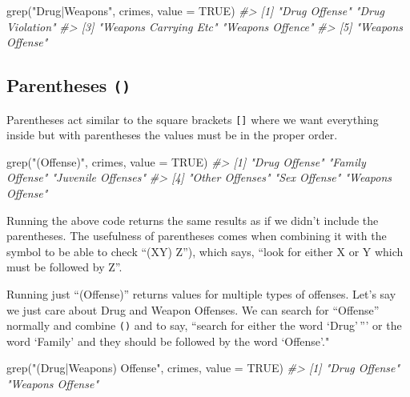 \documentclass[
]{krantz}
\makeatletter
\newenvironment{Shaded}{\begin{snugshade}}{\end{snugshade}}
\newcommand{\AttributeTok}[1]{\textcolor[rgb]{0.61,0.61,0.61}{#1}}
\newcommand{\CommentTok}[1]{\textcolor[rgb]{0.37,0.37,0.37}{\textit{#1}}}
\newcommand{\ConstantTok}[1]{\textcolor[rgb]{0,0,0}{#1}}
\newcommand{\FunctionTok}[1]{\textcolor[rgb]{0,0,0}{#1}}
\newcommand{\NormalTok}[1]{#1}
\newcommand{\StringTok}[1]{\textcolor[rgb]{0.5,0.5,0.5}{#1}}
\newenvironment{kframe}{%
\medskip{}
\setlength{\fboxsep}{.8em}
 \def\at@end@of@kframe{}%
 \ifinner\ifhmode%
  \def\at@end@of@kframe{\end{minipage}}%
  \begin{minipage}{\columnwidth}%
 \fi\fi%
 \def\FrameCommand##1{\hskip\@totalleftmargin \hskip-\fboxsep
 \colorbox{shadecolor}{##1}\hskip-\fboxsep
     \hskip-\linewidth \hskip-\@totalleftmargin \hskip\columnwidth}%
 \MakeFramed {\advance\hsize-\width
   \@totalleftmargin\z@ \linewidth\hsize
   \@setminipage}}%
 {\par\unskip\endMakeFramed%
 \at@end@of@kframe}
\renewenvironment{Shaded}{\begin{kframe}}{\end{kframe}}
\makeatother
\begin{document}
\begin{Shaded}
\begin{Highlighting}[]
\FunctionTok{grep}\NormalTok{(}\StringTok{"Drug|Weapons"}\NormalTok{, crimes, }\AttributeTok{value =} \ConstantTok{TRUE}\NormalTok{)}
\CommentTok{\#\textgreater{} [1] "Drug Offense"         "Drug Violation"      }
\CommentTok{\#\textgreater{} [3] "Weapons Carrying Etc" "Weapons Offence"     }
\CommentTok{\#\textgreater{} [5] "Weapons Offense"}
\end{Highlighting}
\end{Shaded}

\hypertarget{parentheses}{%
\subsection{\texorpdfstring{Parentheses \texttt{()}}{Parentheses ()}}\label{parentheses}}

Parentheses act similar to the square brackets \texttt{{[}{]}} where we want everything inside but with parentheses the values must be in the proper order.

\begin{Shaded}
\begin{Highlighting}[]
\FunctionTok{grep}\NormalTok{(}\StringTok{"(Offense)"}\NormalTok{, crimes, }\AttributeTok{value =} \ConstantTok{TRUE}\NormalTok{)}
\CommentTok{\#\textgreater{} [1] "Drug Offense"      "Family Offense"    "Juvenile Offenses"}
\CommentTok{\#\textgreater{} [4] "Other Offenses"    "Sex Offense"       "Weapons Offense"}
\end{Highlighting}
\end{Shaded}

Running the above code returns the same results as if we didn't include the parentheses. The usefulness of parentheses comes when combining it with the \texttt{\textbar{}} symbol to be able to check ``(X\textbar Y) Z''), which says, ``look for either X or Y which must be followed by Z''.

Running just ``(Offense)'' returns values for multiple types of offenses. Let's say we just care about Drug and Weapon Offenses. We can search for ``Offense'' normally and combine \texttt{()} and \texttt{\textbar{}} to say, ``search for either the word `Drug'\,''' or the word `Family' and they should be followed by the word `Offense'."

\begin{Shaded}
\begin{Highlighting}[]
\FunctionTok{grep}\NormalTok{(}\StringTok{"(Drug|Weapons) Offense"}\NormalTok{, crimes, }\AttributeTok{value =} \ConstantTok{TRUE}\NormalTok{)}
\CommentTok{\#\textgreater{} [1] "Drug Offense"    "Weapons Offense"}
\end{Highlighting}
\end{Shaded}
\end{document}
